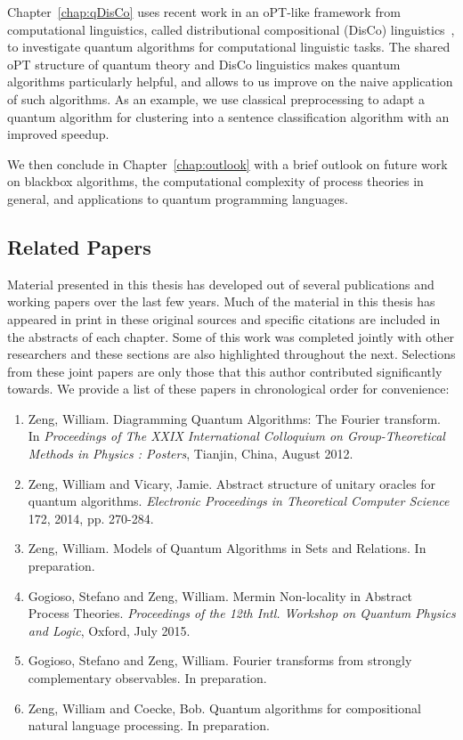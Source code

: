 Chapter~\ref{chap:qDisCo} uses recent work in an oPT-like framework from computational linguistics, called distributional compositional (DisCo) linguistics~\cite{clark2008compositional}, to investigate quantum algorithms for computational linguistic tasks. The shared oPT structure of quantum theory and DisCo linguistics makes quantum algorithms particularly helpful, and allows to us improve on the naive application of such algorithms. As an example, we use classical preprocessing to adapt a quantum algorithm for clustering into a sentence classification algorithm with an improved speedup.

We then conclude in Chapter~\ref{chap:outlook} with a brief outlook on future work on blackbox algorithms, the computational complexity of process theories in general, and applications to quantum programming languages.
 
\subsection*{Related Papers}

Material presented in this thesis has developed out of several publications and working papers over the last few years. Much of the material in this thesis has appeared in print in these original sources and specific citations are included in the abstracts of each chapter. Some of this work was completed jointly with other researchers and these sections are also highlighted throughout the next.  Selections from these joint papers are only those that this author contributed significantly towards. We provide a list of these papers in chronological order for convenience:

\begin{enumerate}
\item Zeng, William. Diagramming Quantum Algorithms: The Fourier transform. In \emph{Proceedings of The XXIX International Colloquium on Group-Theoretical Methods in Physics
: Posters}, Tianjin, China, August 2012.
\item Zeng, William and Vicary, Jamie. Abstract structure of unitary oracles for quantum algorithms. \emph{Electronic Proceedings in Theoretical Computer Science} 172, 2014, pp. 270-284.
\item Zeng, William. Models of Quantum Algorithms in Sets and Relations. In preparation.
\item Gogioso, Stefano and Zeng, William. Mermin Non-locality in Abstract Process Theories. \emph{Proceedings of the 12th Intl. Workshop on Quantum Physics and Logic}, Oxford, July 2015.
\item Gogioso, Stefano and Zeng, William. Fourier transforms from strongly complementary observables. In preparation.
\item Zeng, William and Coecke, Bob. Quantum algorithms for compositional natural language processing. In preparation.
\end{enumerate}

